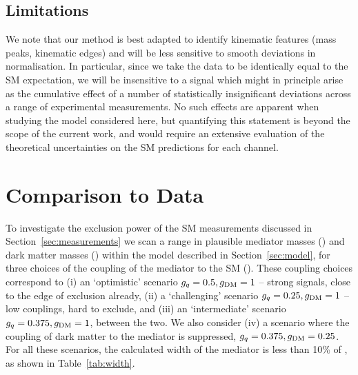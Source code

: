 \documentclass[floatfix]{article}
\begin{document}



\subsection{Limitations}

We note that our method is best adapted to identify kinematic features (mass peaks, kinematic edges) and will be less sensitive to smooth
deviations in normalisation. In particular, since we take the data to be identically equal to the SM expectation, we will be insensitive 
to a signal which might in principle arise as the cumulative effect of a number of statistically insignificant deviations 
across a range of experimental measurements.
No such effects are apparent when studying the model considered here, but quantifying this statement is beyond the scope of the current work, 
and would require an extensive evaluation of the theoretical uncertainties on the SM predictions for each channel.


\section{Comparison to Data}\label{sec:kinematics}

To investigate the exclusion power of the SM measurements discussed in Section~\ref{sec:measurements} we scan a range in 
plausible mediator masses (\MZP) and dark matter masses (\MDM) within the model described in Section~\ref{sec:model}, for three choices of
the coupling of the mediator to the SM (\GQ). These coupling choices correspond to (i) an `optimistic' scenario $g_{q} = 0.5, g_{\rm DM} = 1$ -- strong signals, 
close to the edge of exclusion already, (ii) a `challenging' scenario $g_{q} = 0.25, g_{\rm DM} = 1$ -- low couplings, hard to exclude, 
and (iii) an `intermediate' scenario $g_{q} = 0.375, g_{\rm DM} = 1$, between the two. We also consider (iv) a scenario where the coupling of dark matter to the mediator is
suppressed, $g_{q} = 0.375, g_{\rm DM} = 0.25$. For all these scenarios, the calculated width of the mediator is less than 10\% of \MZP, as shown in Table~\ref{tab:width}.
\end{document}

